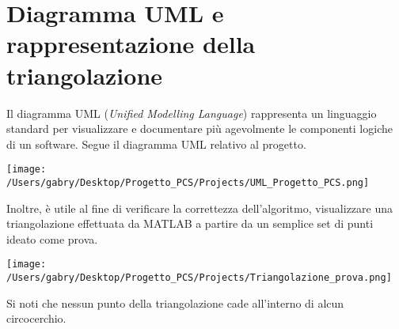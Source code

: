 \documentclass{article}
\begin{document}
\section{Diagramma UML e rappresentazione della triangolazione}
Il diagramma UML (\emph{Unified Modelling Language}) rappresenta un linguaggio standard per visualizzare e documentare più agevolmente le componenti logiche di un software.  Segue il diagramma UML relativo al progetto.

\begin{center}
	\texttt{[image: /Users/gabry/Desktop/Progetto\_PCS/Projects/UML\_Progetto\_PCS.png]}
\end{center}

Inoltre,  è utile al fine di verificare la correttezza dell'algoritmo,  visualizzare una triangolazione effettuata da MATLAB a partire da un semplice set di punti ideato come prova.  

\begin{center}
	\texttt{[image: /Users/gabry/Desktop/Progetto\_PCS/Projects/Triangolazione\_prova.png]}
\end{center}

Si noti che nessun punto della triangolazione cade all'interno di alcun circocerchio.
\end{document}
